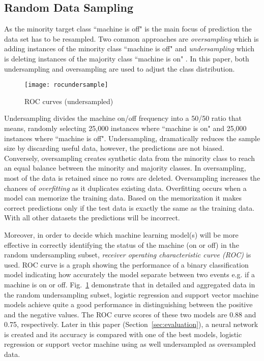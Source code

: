 \documentclass[runningheads]{llncs}
\begin{document}
\subsection {Random Data Sampling}
\label{sec:sampling}
As the minority target class ``machine is off" is the main focus of prediction the data set has to be resampled. Two common approaches are \emph{oversampling} which is adding instances of the minority class ``machine is off" and \emph{undersampling} which is  deleting instances of the majority class ``machine is on" \cite{Gonzales}. In this paper, both undersampling and oversampling are used to adjust the class distribution. 

\begin{figure}
\centering
\texttt{[image: rocundersample]} 
\caption{ROC curves (undersampled)}
\label{fig:machineon}
\end{figure}

Undersampling divides the machine on/off frequency into a 50/50 ratio that means, randomly selecting 25,000 instances where ``machine is on" and 25,000 instances where ``machine is off". Undersampling, dramatically reduces the sample size by discarding useful data, however, the predictions are not biased. Conversely, oversampling creates synthetic data from the minority class to reach an equal balance between the minority and majority classes. In oversampling, most of the data is retained since no rows are deleted. Oversampling increases the chances of \emph{overfitting} as it duplicates existing data. Overfitting occurs when a model can memorize the training data. Based on the memorization it makes correct predictions only if the test data is exactly the same as the training data. With all other datasets the predictions will be incorrect. 



Moreover, in order to decide which machine learning model(s) will be more effective in correctly identifying the status of the machine (on or off) in the random undersampling subset, \emph{receiver operating characteristic curve (ROC)} \cite{book} is used. ROC curve is a graph showing the performance of a binary classification model indicating how accurately the model separate between two events e.g. if a machine is on or off. Fig.~\ref{fig:machineon} demonstrate that in detailed and aggregated data in the random undersampling subset, logistic regression and support vector machine models achieve quite a good performance in distinguishing between the positive and the negative values. The ROC curve scores of these two models are 0.88 and 0.75, respectively. Later in this paper (Section~\ref{sec:evaluation}), a neural network is created and its accuracy is compared with one of the best models, logistic regression or support vector machine using as well undersampled as oversampled data.
\end{document}
